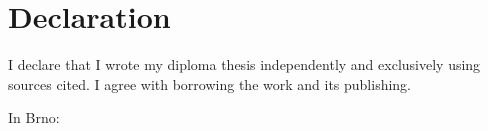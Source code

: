 \chapter*{Declaration}
\vfill

  I declare that I wrote my diploma thesis independently and
  exclusively using sources cited. I agree with borrowing the work and
  its publishing.

\bigskip
\bigskip
\bigskip

\noindent{}In Brno:

